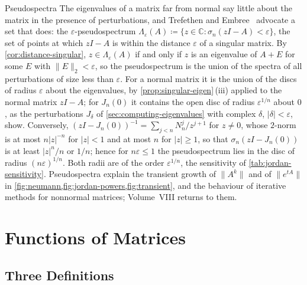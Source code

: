 \begin{note}{Pseudospectra}
The eigenvalues of a matrix far from normal say little about the matrix in the presence of perturbations, and Trefethen and Embree~\cite{trefethen2005} advocate a set that does: the $\varepsilon$-pseudospectrum $\Lambda_\varepsilon(A)\coloneqq\{z\in\mathbb C:\sigma_n(zI-A)<\varepsilon\}$, the set of points at which $zI-A$ is within the distance $\varepsilon$ of a singular matrix. By \cref{cor:distance-singular}, $z\in\Lambda_\varepsilon(A)$ if and only if $z$ is an eigenvalue of $A+E$ for some $E$ with $\|E\|_2<\varepsilon$, so the pseudospectrum is the union of the spectra of all perturbations of size less than $\varepsilon$. For a normal matrix it is the union of the discs of radius $\varepsilon$ about the eigenvalues, by \cref{prop:singular-eigen}\,(iii) applied to the normal matrix $zI-A$; for $J_n(0)$ it contains the open disc of radius $\varepsilon^{1/n}$ about $0$, as the perturbations $J_\delta$ of \cref{sec:computing-eigenvalues} with complex $\delta$, $|\delta|<\varepsilon$, show. Conversely, $(zI-J_n(0))^{-1}=\sum_{j<n}N_n^j/z^{j+1}$ for $z\ne0$, whose $2$-norm is at most $n|z|^{-n}$ for $|z|<1$ and at most $n$ for $|z|\ge1$, so that $\sigma_n(zI-J_n(0))$ is at least $|z|^n/n$ or $1/n$; hence for $n\varepsilon\le1$ the pseudospectrum lies in the disc of radius $(n\varepsilon)^{1/n}$. Both radii are of the order $\varepsilon^{1/n}$, the sensitivity of \cref{tab:jordan-sensitivity}. Pseudospectra explain the transient growth of $\|A^k\|$ and of $\|e^{tA}\|$ in \cref{fig:neumann,fig:jordan-powers,fig:transient}, and the behaviour of iterative methods for nonnormal matrices; Volume~VIII returns to them.
\end{note}

\section{Functions of Matrices}
\label{sec:matrix-functions}

\subsection{Three Definitions}

